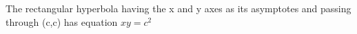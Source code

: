  The rectangular hyperbola having the x and y axes as its asymptotes and
passing through (c,c) has equation $xy=c^{2}$ 

